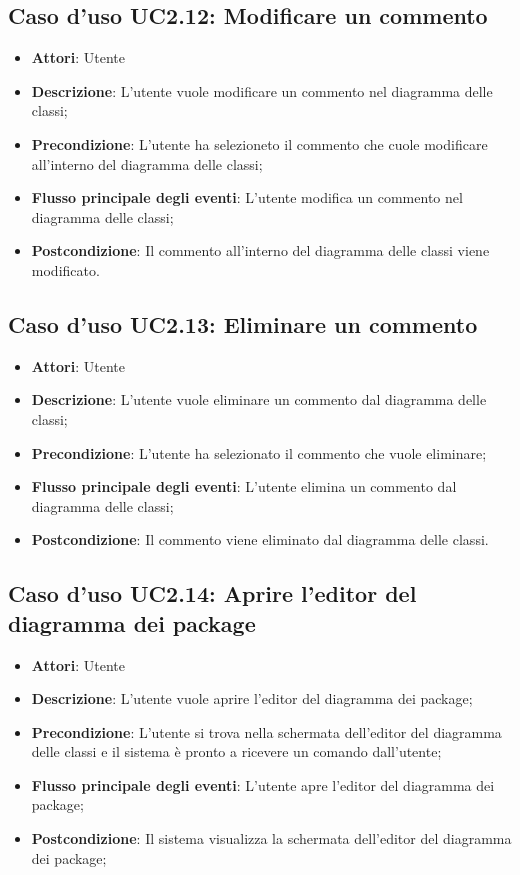 \documentclass[../AnalisiDeiRequisiti.tex]{subfiles}
\begin{document}
		\subsection{Caso d'uso UC2.12: Modificare un commento}
		\begin{itemize}
			\item \textbf{Attori}: Utente
			\item \textbf{Descrizione}: L'utente vuole modificare un commento nel diagramma delle classi;
			\item \textbf{Precondizione}: L'utente ha selezioneto il commento che cuole modificare all'interno del diagramma delle classi;
			\item \textbf{Flusso principale degli eventi}: L'utente modifica un commento nel diagramma delle classi;
			\item \textbf{Postcondizione}: Il commento all'interno del diagramma delle classi viene modificato.
		\end{itemize}
		\subsection{Caso d'uso UC2.13: Eliminare un commento}
		\begin{itemize}
			\item \textbf{Attori}: Utente
			\item \textbf{Descrizione}: L'utente vuole eliminare un commento dal diagramma delle classi;
			\item \textbf{Precondizione}: L'utente ha selezionato il commento che vuole eliminare;
			\item \textbf{Flusso principale degli eventi}: L'utente elimina un commento dal diagramma delle classi;
			\item \textbf{Postcondizione}: Il commento viene eliminato dal diagramma delle classi.
		\end{itemize}
		\subsection{Caso d'uso UC2.14: Aprire l'editor del diagramma dei package}
		\begin{itemize}
			\item \textbf{Attori}: Utente
			\item \textbf{Descrizione}: L'utente vuole aprire l'editor del diagramma dei package;
			\item \textbf{Precondizione}: L'utente si trova nella schermata dell'editor del diagramma delle classi e il sistema è pronto a ricevere un comando dall'utente;
			\item \textbf{Flusso principale degli eventi}: L'utente apre l'editor del diagramma dei package;
			\item \textbf{Postcondizione}: Il sistema visualizza la schermata dell'editor del diagramma dei package;
		\end{itemize}
\end{document}
